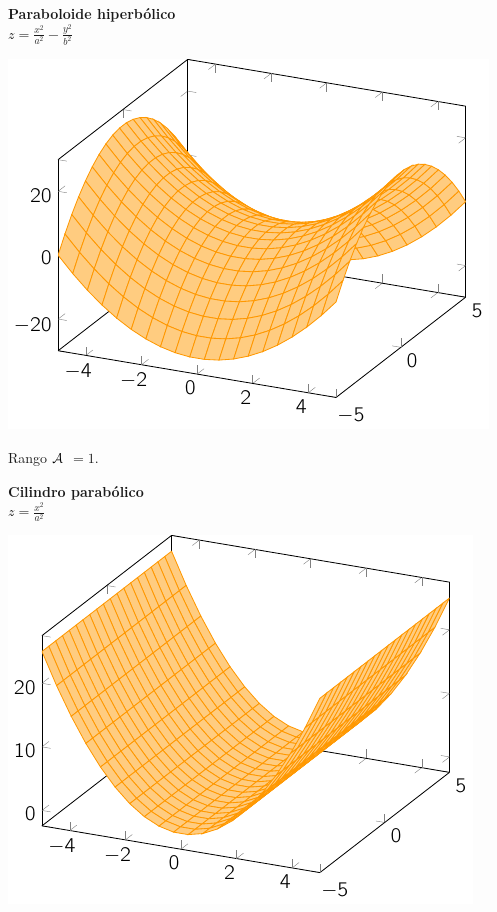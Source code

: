 \documentclass[11pt, a4paper]{article}
\newif\IfInSansMode
\theoremstyle{theorem-style}
\theoremstyle{definition-style}
\theoremstyle{remark-style}
\theoremstyle{example-style}
\begin{document}
\begin{minipage}[c]{0.5\textwidth}
  {\bf Paraboloide hiperbólico}\vspace{1em}\\
  $\displaystyle z = \frac{x^2}{a^2} - \frac{y^2}{b^2}$
\end{minipage}\hfill
\begin{minipage}[]{0.5\textwidth}
    \includegraphics{./img/phip.pdf}
\end{minipage}

Rango $\cal A$ $=1$.

\begin{minipage}[c]{0.45\textwidth}
  {\bf Cilindro parabólico}\vspace{1em}\\
  $\displaystyle z = \frac{x^2}{a^2}$
\end{minipage}\hfill
\begin{minipage}[]{0.45\textwidth}
\includegraphics{./img/cpar.pdf}
\end{minipage}
\end{document}
